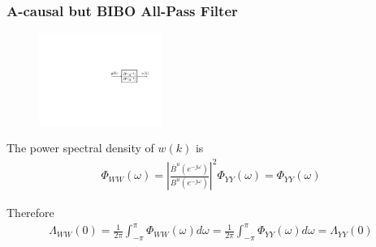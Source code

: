 \begin{frame}
    \frametitle{A-causal but BIBO All-Pass Filter}

    \begin{figure}
        \includegraphics[width=4cm]{MVR_figs_ac2}
    \end{figure}

    The power spectral density of $w(k)$ is
    \begin{align*}
        \Phi_{WW}(\omega) = \left| \frac{\bar{B}^u(e^{-j\omega})}{B^u(e^{-j\omega})} \right|^2 \Phi_{YY}(\omega)
            = \Phi_{YY}(\omega)
    \end{align*}
    \pause

    Therefore
    \begin{align*}
        \Lambda_{WW}(0) = \frac{1}{2\pi} \int_{-\pi}^\pi \Phi_{WW}(\omega) d\omega
            = \frac{1}{2\pi} \int_{-\pi}^\pi \Phi_{YY}(\omega) d\omega
            = \Lambda_{YY}(0)
    \end{align*}
    \pause


\end{frame} 